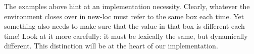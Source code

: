The examples above hint at an implementation necessity. Clearly, whatever the
environment closes over in new-loc must refer to the same box each time. Yet
something also needs to make sure that the value in that box is different each
time! Look at it more carefully: it must be lexically the same, but dynamically
different. This distinction will be at the heart of our implementation.

\secup
